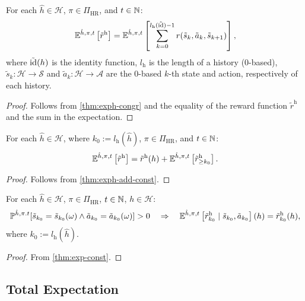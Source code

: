 \begin{theorem}\label{thm:expret-eq-sum-rew}
  For each $\hat{h}\in \mathcal{H}$, $\pi \in \Pi_{\mathrm{HR}}$, and $t\in \mathbb{N}$:
  \[
    \mathbb{E}^{\hat{h}, \pi, t} \left[ \tilde{r}^{\mathrm{h}} \right]
    =
    \mathbb{E}^{\hat{h}, \pi, t} \left[ \sum_{k=0}^{l_{\mathrm{h}}(\tilde{\operatorname{id}})-1}  r(\tilde{s}_k, \tilde{a}_k, \tilde{s}_{k+1}) \right],
  \]
  where $\tilde{\operatorname{id}}(h)$ is the identity function, $l_{\mathrm{h}}$ is the length of a history (0-based), $\tilde{s}_k\colon \mathcal{H} \to \mathcal{S}$ and $\tilde{a}_k\colon \mathcal{H} \to \mathcal{A}$ are the 0-based $k$-th state and action, respectively of each history.
  \leanok
\end{theorem}
\begin{proof}
Follows from \cref{thm:exph-congr} and the equality of the reward function $\tilde{r}^{\mathrm{h}}$ and the sum in the expectation.
\end{proof}


\begin{theorem}\label{thm:sum-rew-eq-sum-rew-rg}
  For each $\hat{h}\in \mathcal{H}$, where $k_0:=l_{\mathrm{h}}(\hat{h})$, $\pi \in \Pi_{\mathrm{HR}}$, and $t\in \mathbb{N}$:
  \[
    \mathbb{E}^{\hat{h}, \pi, t} \left[  \tilde{r}^{\mathrm{h}} \right]
    =
    \tilde{r}^{\mathrm{h}}(h) + \mathbb{E}^{\hat{h}, \pi, t} \left[ \tilde{r}^{\mathrm{h}}_{\ge k_0} \right].
  \]
\end{theorem}
\begin{proof}
Follows from \cref{thm:exph-add-const}.
\end{proof}

\begin{theorem}\label{thm:sum-rew-cnd}
For each $\hat{h}\in \mathcal{H}$, $\pi \in \Pi_{\mathrm{HR}}$, $t\in \mathbb{N}$, $h\in \mathcal{H}$:
\begin{equation*}
  \mathbb{P}^{\hat{h},\pi.t}[\tilde{s}_{k_0}=\tilde{s}_{k_0}(\omega) \wedge \tilde{a}_{k_0} = \tilde{a}_{k_0}(\omega) ] > 0
\quad\Rightarrow \quad
  \mathbb{E}^{\hat{h}, \pi, t} \left[ \tilde{r}^{\mathrm{h}}_{k_0} \mid  \tilde{s}_{k_0}, \tilde{a}_{k_0}\right](h) = \tilde{r}^{\mathrm{h}}_{k_0}(h),
\end{equation*}
where $k_0:=l_{\mathrm{h}}(\hat{h})$.
\end{theorem}
\begin{proof}
 From \cref{thm:exp-const}. 
\end{proof}

\subsection{Total Expectation}

